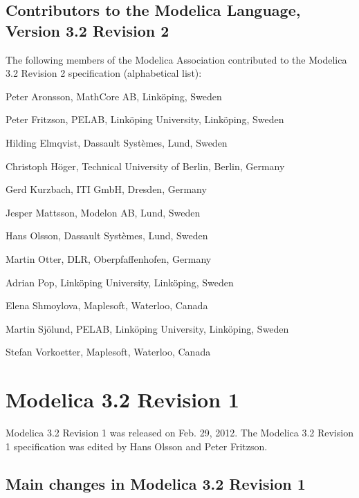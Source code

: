 \subsection{Contributors to the Modelica Language, Version 3.2 Revision 2}\label{contributors-to-the-modelica-language-version-3-2-revision-2}

The following members of the Modelica Association contributed to the
Modelica 3.2 Revision 2 specification (alphabetical list):

Peter Aronsson, MathCore AB, Linköping, Sweden

Peter Fritzson, PELAB, Linköping University, Linköping, Sweden

Hilding Elmqvist, Dassault Systèmes, Lund, Sweden

Christoph Höger, Technical University of Berlin, Berlin, Germany

Gerd Kurzbach, ITI GmbH, Dresden, Germany

Jesper Mattsson, Modelon AB, Lund, Sweden

Hans Olsson, Dassault Systèmes, Lund, Sweden

Martin Otter, DLR, Oberpfaffenhofen, Germany

Adrian Pop, Linköping University, Linköping, Sweden

Elena Shmoylova, Maplesoft, Waterloo, Canada

Martin Sjölund, PELAB, Linköping University, Linköping, Sweden

Stefan Vorkoetter, Maplesoft, Waterloo, Canada

\section{Modelica 3.2 Revision 1}\label{modelica-3-2-revision-1}

Modelica 3.2 Revision 1 was released on Feb. 29, 2012. The Modelica 3.2
Revision 1 specification was edited by Hans Olsson and Peter Fritzson.

\subsection{Main changes in Modelica 3.2 Revision 1}\label{main-changes-in-modelica-3-2-revision-1}

